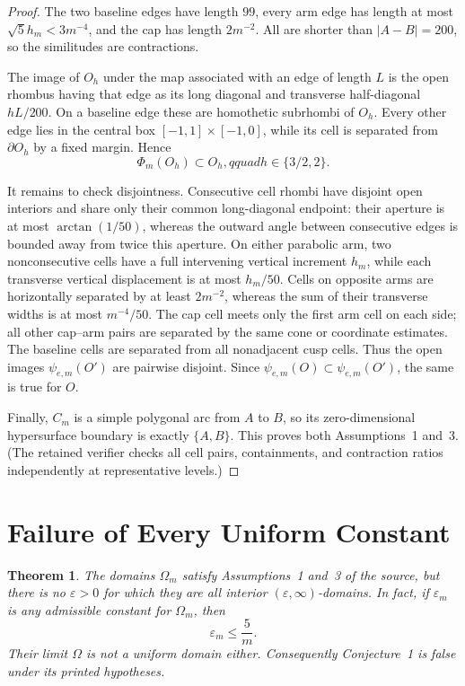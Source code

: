 \documentclass[11pt]{article}
\newtheorem{theorem}{Theorem}
\newcommand{\Om}{\Omega}
\begin{document}
\begin{proof}
The two baseline edges have length \(99\), every arm edge has length at most
\(\sqrt5h_m<3m^{-4}\), and the cap has length \(2m^{-2}\).  All are shorter
than \(|A-B|=200\), so the similitudes are contractions.

The image of \(O_h\) under the map associated with an edge of length \(L\)
is the open rhombus having that edge as its long diagonal and transverse
half-diagonal \(hL/200\).  On a baseline edge these are homothetic subrhombi
of \(O_h\).  Every other edge lies in the central box
\([-1,1]\times[-1,0]\), while its cell is separated from \(\partial O_h\)
by a fixed margin.  Hence
\[
                    \Phi_m(O_h)\subset O_h,qquad h\in\{3/2,2\}.
\]

It remains to check disjointness.  Consecutive cell rhombi have disjoint open
interiors and share only their common long-diagonal endpoint: their aperture
is at most \(\arctan(1/50)\), whereas the outward angle between consecutive
edges is bounded away from twice this aperture.  On either parabolic arm,
two nonconsecutive cells have a full intervening vertical increment \(h_m\),
while each transverse vertical displacement is at most \(h_m/50\).
Cells on opposite arms are horizontally separated by at least \(2m^{-2}\),
whereas the sum of their transverse widths is at most \(m^{-4}/50\).
The cap cell meets only the first arm cell on each side; all other cap--arm
pairs are separated by the same cone or coordinate estimates.  The baseline
cells are separated from all nonadjacent cusp cells.  Thus the open images
\(\psi_{e,m}(O')\) are pairwise disjoint.  Since
\(\psi_{e,m}(O)\subset\psi_{e,m}(O')\), the same is true for \(O\).

Finally, \(C_m\) is a simple polygonal arc from \(A\) to \(B\), so its
zero-dimensional hypersurface boundary is exactly \(\{A,B\}\).  This proves
both Assumptions~1 and~3.  (The retained verifier checks all cell pairs,
containments, and contraction ratios independently at representative levels.)
\end{proof}

\section*{Failure of Every Uniform Constant}

\begin{theorem}\label{thm:main}
The domains \(\Om_m\) satisfy Assumptions~1 and~3 of the source, but there is
no \(\varepsilon>0\) for which they are all interior
\((\varepsilon,\infty)\)-domains.  In fact, if \(\varepsilon_m\) is any
admissible constant for \(\Om_m\), then
\[
                            \varepsilon_m\le \frac5m.
\]
Their limit \(\Om\) is not a uniform domain either.  Consequently
Conjecture~1 is false under its printed hypotheses.
\end{theorem}
\end{document}
